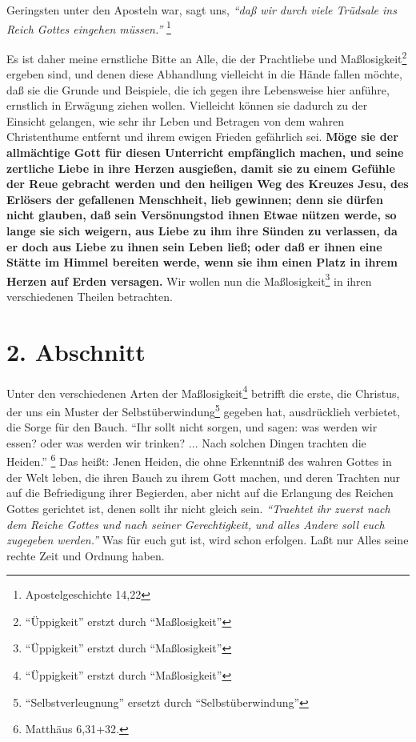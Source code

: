 Geringsten unter den Aposteln war, sagt uns,
\textit{"`daß wir durch viele Trüdsale ins
Reich Gottes eingehen müssen."'}
\footnote{Apostelgeschichte 14,22}

Es ist daher meine
ernstliche Bitte an Alle, die der Prachtliebe und Maßlosigkeit\footnote{"`Üppigkeit"' erstzt durch "`Maßlosigkeit"'} ergeben sind, und
denen diese Abhandlung vielleicht in die Hände fallen möchte, daß sie die Grunde
und Beispiele, die ich gegen ihre Lebensweise hier anführe, ernstlich in
Erwägung ziehen wollen. Vielleicht können sie dadurch zu der Einsicht gelangen,
wie sehr ihr Leben und Betragen von dem wahren Christenthume entfernt und ihrem
ewigen Frieden gefährlich sei. \textbf{Möge sie der allmächtige Gott für diesen
Unterricht empfänglich machen, und seine zertliche Liebe in ihre Herzen
ausgießen, damit sie zu einem Gefühle der Reue gebracht werden und den heiligen
Weg des Kreuzes Jesu, des Erlösers der gefallenen Menschheit, lieb gewinnen;
denn sie dürfen nicht glauben, daß sein Versönungstod ihnen Etwae nützen werde,
so lange sie sich weigern, aus Liebe zu ihm ihre Sünden zu verlassen, da er doch
aus Liebe zu ihnen sein Leben ließ; oder daß er ihnen eine Stätte im Himmel
bereiten werde, wenn sie ihm einen Platz in ihrem Herzen auf Erden versagen.} Wir
wollen nun die Maßlosigkeit\footnote{"`Üppigkeit"' erstzt durch "`Maßlosigkeit"'} in ihren verschiedenen Theilen betrachten.

\section{2. Abschnitt} \label{kap14_ab2}

Unter den verschiedenen Arten der Maßlosigkeit\footnote{"`Üppigkeit"' erstzt durch "`Maßlosigkeit"'} betrifft die erste, die Christus,
der uns ein Muster der Selbstüberwindung\footnote{"`Selbstverleugnung"' ersetzt durch "`Selbstüberwindung"'} gegeben hat, ausdrücklieh verbietet,
die Sorge für den Bauch.
"`Ihr sollt nicht sorgen, und sagen: was werden wir
essen? oder was werden wir trinken? ... Nach solchen Dingen trachten die
Heiden."'
\footnote{Matthäus 6,31+32.}
Das heißt: Jenen Heiden, die ohne
Erkenntniß des wahren Gottes in der Welt leben, die ihren Bauch zu ihrem Gott
machen, und deren Trachten nur auf die Befriedigung ihrer Begierden, aber nicht
auf die Erlangung des Reichen Gottes gerichtet ist, denen sollt ihr nicht gleich
sein.
\textit{"`Traehtet ihr zuerst nach dem Reiche Gottes und nach seiner
Gerechtigkeit, und alles Andere soll euch zugegeben werden."'} Was für euch gut
ist, wird schon erfolgen. Laßt nur Alles seine rechte Zeit und Ordnung haben.

